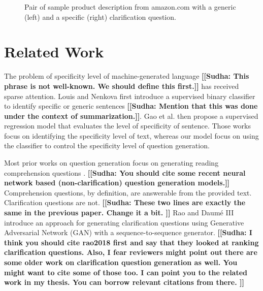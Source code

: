 \documentclass[11pt]{article}
\newcommand{\sudha}[1]{\textbf{\textsf{\textcolor{blue!80!white}{\footnotesize [[Sudha: #1]]}}}}
\begin{document}
\begin{figure}[h]
    \caption{Pair of sample product description from amazon.com with a generic (left) and a specific (right) clarification question.}\label{amazon-ex-1}
\end{figure}

\section{Related Work}
The problem of specificity level of machine-generated language \sudha{This phrase is not well-known. We should define this first.} has received sparse attention. Louis and Nenkova  \cite{louis2011automatic} first introduce a supervised binary classifier to identify specific or generic sentences \sudha{Mention that this was done under the context of summarization.}. Gao et al. \cite{Gao2019PredictingAA} then propose a supervised regression model that evaluates the level of specificity of sentence. Those works focus on identifying the specificity level of text, whereas our model focus on using the classifier to control the specificity level of question generation.

Most prior works on question generation focus on generating reading comprehension questions \cite{vanderwende2008importance}. \sudha{You should cite some recent neural network based (non-clarification) question generation models.} Comprehension questions, by definition, are answerable from the provided text. Clarification questions are not. \sudha{These two lines are exactly the same in the previous paper. Change it a bit. } Rao and Daum{\'e} III \cite{rao2019} introduce an approach for generating clarification questions using Generative Adversarial Network (GAN) \cite{goodfellow2014generative} with a sequence-to-sequence generator. \sudha{I think you should cite rao2018 first and say that they looked at ranking clarification questions. Also, I fear reviewers might point out there are some older work on clarification question generation as well. You might want to cite some of those too. I can point you to the related work in my thesis. You can borrow relevant citations from there. } 
\end{document}
